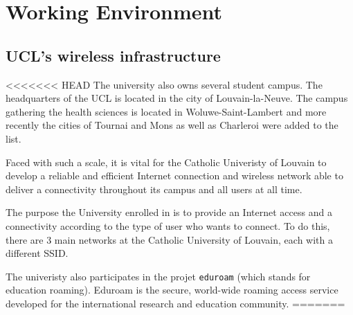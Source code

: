 
\chapter{Working Environment} %

\label{Chapter2} %



\section{UCL's wireless infrastructure}

<<<<<<< HEAD
The university also owns several student campus. The headquarters of the UCL is located in the city of Louvain-la-Neuve. The campus gathering the health sciences is located in Woluwe-Saint-Lambert and more recently the cities of Tournai and Mons as well as Charleroi were added to the list.

Faced with such a scale, it is vital for the Catholic Univeristy of Louvain to develop a reliable and efficient Internet connection and wireless network able to deliver a connectivity throughout its campus and all users at all time.

The purpose the University enrolled in is to provide an Internet access and a connectivity according to the type of user who wants to connect. To do this, there are 3 main networks at the Catholic University of Louvain, each with a different SSID.

The univeristy also participates in the projet \texttt{eduroam} (which stands for education roaming). Eduroam is the secure, world-wide roaming access service developed for the international research and education community\cite{eduroam1}.
=======
